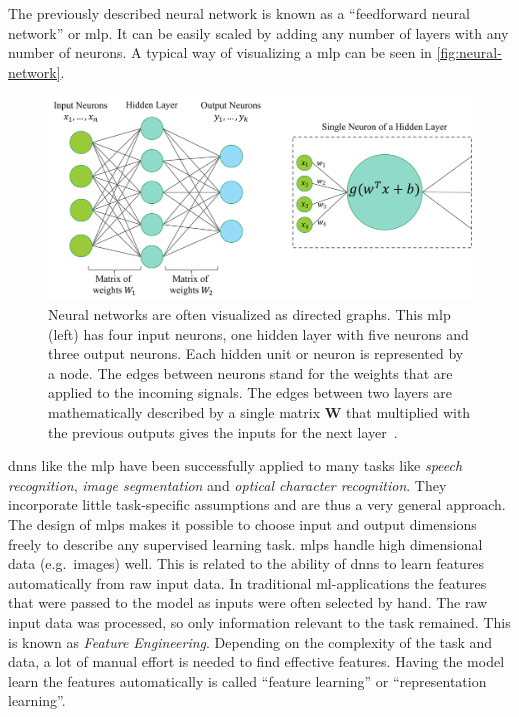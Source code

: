 The previously described neural network is known as a \enquote{feedforward neural network} or \gls{mlp}.
It can be easily scaled by adding any number of layers with any number of neurons.
A typical way of visualizing a \gls{mlp} can be seen in \autoref{fig:neural-network}.
\begin{figure}
    \centering
    \includegraphics[width=\linewidth]{images/nn}
    \caption[Visualization of a neural network.]{Neural networks are often visualized as directed graphs. This \gls{mlp} (left) has four input neurons, one hidden layer with five neurons and three output neurons. Each hidden unit or neuron is represented by a node. The edges between neurons stand for the weights that are applied to the incoming signals. The edges between two layers are mathematically described by a single matrix $\boldsymbol{W}$ that multiplied with the previous outputs gives the inputs for the next layer~\autocite{sonnet2022NeuralBoook, Goodfellow-et-al-2016}.}
    \label{fig:neural-network}
\end{figure}

\glspl{dnn} like the \gls{mlp} have been successfully applied to many tasks like \textit{speech recognition}, \textit{image segmentation} and \textit{optical character recognition}.
They incorporate little task-specific assumptions and are thus a very general approach.
The design of \glspl{mlp} makes it possible to choose input and output dimensions freely to describe any supervised learning task.
\glspl{mlp} handle high dimensional data (e.g.\ images) well.
This is related to the ability of \glspl{dnn} to learn features automatically from raw input data.
In traditional \gls{ml}-applications the features that were passed to the model as inputs were often selected by hand.
The raw input data was processed, so only information relevant to the task remained.
This is known as \textit{Feature Engineering}.
Depending on the complexity of the task and data, a lot of manual effort is needed to find effective features.
Having the model learn the features automatically is called \enquote{feature learning} or \enquote{representation learning}.

